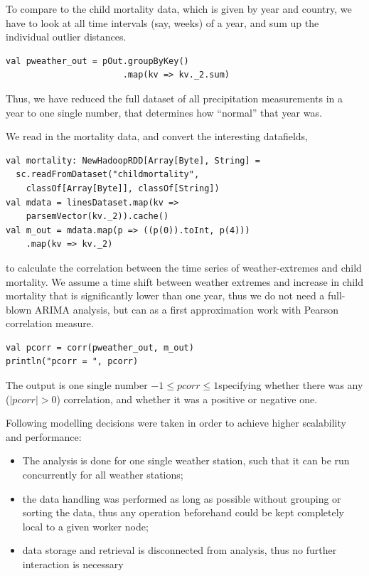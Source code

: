\documentclass[
10pt, %
a4paper, %
oneside, %
headinclude,footinclude, %
useAMS,
usenatbib
]{mn2e}  %
\begin{document}
To compare to the child mortality data, which is given by year and country, we have to look at all time intervals (say, weeks) of a year, and sum up the individual outlier distances.

\begin{verbatim}
val pweather_out = pOut.groupByKey()
                       .map(kv => kv._2.sum)
\end{verbatim}

Thus, we have reduced the full dataset of all precipitation measurements in a year to one single number, that determines how “normal” that year was.

We read in the mortality data, and convert the interesting datafields,

\begin{verbatim}
val mortality: NewHadoopRDD[Array[Byte], String] =
  sc.readFromDataset("childmortality",
    classOf[Array[Byte]], classOf[String])
val mdata = linesDataset.map(kv =>
    parsemVector(kv._2)).cache()
val m_out = mdata.map(p => ((p(0)).toInt, p(4)))
    .map(kv => kv._2)
\end{verbatim}

to calculate the correlation between the time series of weather-extremes and child mortality. We assume a time shift between weather extremes and increase in child mortality that is significantly lower than one year, thus we do not need a full-blown ARIMA analysis, but can as a first approximation work with Pearson correlation measure.

\begin{verbatim}
val pcorr = corr(pweather_out, m_out)
println("pcorr = ", pcorr)
\end{verbatim}

The output is one single number $-1\leq pcorr\leq1$specifying whether there was any
($|pcorr|>0$) correlation, and whether it was a positive or negative
one.

Following modelling decisions were taken in order to achieve higher scalability and performance:

\begin{itemize}
    \item The analysis is done for one single weather station, such that it can be run concurrently for all weather stations;
    \item the data handling was performed as long as possible without grouping or sorting the data, thus any operation beforehand could be kept completely local to a given worker node;
    \item data storage and retrieval is disconnected from analysis, thus no further interaction is necessary
\end{itemize}
\end{document}
